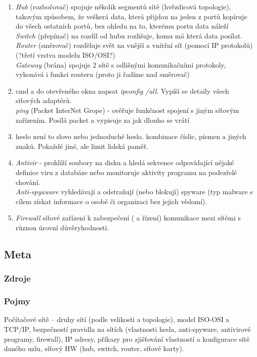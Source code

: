 \documentclass[12pt]{article}
\begin{document}
\begin{enumerate}
\item \emph{Hub} (rozbočovač) spojuje několik segmentů sítě (hvězdicová topologie), takovým způsobem, že veškerá data, která přijdou na jeden z portů kopíruje do všech ostatních portů, bez ohledu na to, kterému portu data náleží\\
\emph{Switch} (přepínač) na rozdíl od hubu rozlišuje, komu má která data posílat.\\
\emph{Router} (směrovač) rozděluje svět na vnější a vnitřní síť (pomocí IP protokolů) (?třetí vrstva modelu ISO/OSI?)\\
\emph{Gateway} (brána) spojuje 2 sítě s odlišnými komunikačními protokoly, vykonává i funkci routeru (proto ji řadíme nad směrovač)
\item cmd a do otevřeného okna napsat \emph{ipconfig /all}. Vypíší se detaily všech síťových adaptérů.\\
\emph{ping} (Packet InterNet Grope) - ověřuje funkčnost spojení s jiným síťovým zařízením. Posílá packet a vypisuje za jak dlouho se vrátí
\item heslo není to slovo nebo jednoduché heslo. kombinace číslic, písmen a jiných znaků. Pokaždé jiné, ale limit lidská paměť.
\item \emph{Antivir} - prohlíží soubory na disku a hledá sekvence odpovídající nějaké definice viru z databáze nebo monitoruje aktivity programu na podezřelé chování.\\
\emph{Anti-spyaware} vyhledávají a odstraňují (nebo blokují) spyware (typ malware s cílem získat informace o osobě či organizaci bez jejich vědomí).\\
\item \emph{Firewall} síťové zařízení k zabezpečení ( a řízení) komunikace mezi sítěmi s různou úrovní důvěryhodnosti.
\end{enumerate}	
\subsection{Meta}
\subsubsection{Zdroje}
\subsubsection{Pojmy}
Počítačové sítě – druhy sítí (podle velikosti a topologie), model ISO-OSI a TCP/IP, bezpečností pravidla na sítích (vlastnosti hesla, anti-spyware, antivirové programy, firewall), IP adresy, příkazy pro zjišťování vlastností a konfigurace sítě daného uzlu, síťový HW (hub, switch, router, síťové karty).
\end{document}
